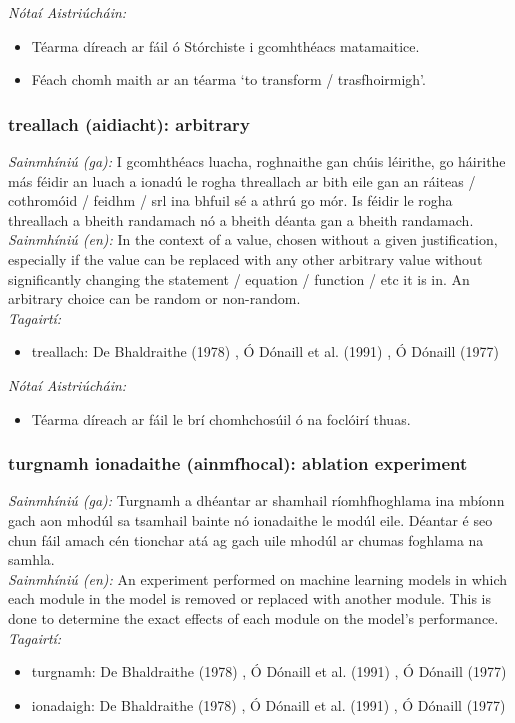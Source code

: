  \noindent \textit{Nótaí Aistriúcháin:}
\begin{itemize}
	\item Téarma díreach ar fáil ó Stórchiste i gcomhthéacs matamaitice.
	\item Féach chomh maith ar an téarma `to transform / trasfhoirmigh'.
\end{itemize}


\subsubsection*{treallach (aidiacht): arbitrary}
 \noindent \textit{Sainmhíniú (ga):} I gcomhthéacs luacha, roghnaithe gan chúis léirithe, go háirithe más féidir an luach a ionadú le rogha threallach ar bith eile gan an ráiteas / cothromóid / feidhm / srl ina bhfuil sé a athrú go mór. Is féidir le rogha threallach a bheith randamach nó a bheith déanta gan a bheith randamach.
\\
 \noindent \textit{Sainmhíniú (en):} In the context of a value, chosen without a given justification, especially if the value can be replaced with any other arbitrary value without significantly changing the statement / equation / function / etc it is in. An arbitrary choice can be random or non-random.
\\
 \noindent \textit{Tagairtí:}
\begin{itemize}
	\item treallach: De Bhaldraithe (1978) \cite{de-bhaldraithe}, Ó Dónaill et al. (1991) \cite{focloir-beag}, Ó Dónaill (1977) \cite{odonaill}
\end{itemize}

 \noindent \textit{Nótaí Aistriúcháin:}
\begin{itemize}
	\item Téarma díreach ar fáil le brí chomhchosúil ó na foclóirí thuas.
\end{itemize}


\subsubsection*{turgnamh ionadaithe (ainmfhocal): ablation experiment}
 \noindent \textit{Sainmhíniú (ga):} Turgnamh a dhéantar ar shamhail ríomhfhoghlama ina mbíonn gach aon mhodúl sa tsamhail bainte nó ionadaithe le modúl eile. Déantar é seo chun fáil amach cén tionchar atá ag gach uile mhodúl ar chumas foghlama na samhla.
\\
 \noindent \textit{Sainmhíniú (en):} An experiment performed on machine learning models in which each module in the model is removed or replaced with another module. This is done to determine the exact effects of each module on the model's performance.
\\
 \noindent \textit{Tagairtí:}
\begin{itemize}
	\item turgnamh: De Bhaldraithe (1978) \cite{de-bhaldraithe}, Ó Dónaill et al. (1991) \cite{focloir-beag}, Ó Dónaill (1977) \cite{odonaill}
	\item ionadaigh: De Bhaldraithe (1978) \cite{de-bhaldraithe}, Ó Dónaill et al. (1991) \cite{focloir-beag}, Ó Dónaill (1977) \cite{odonaill}
\end{itemize}


